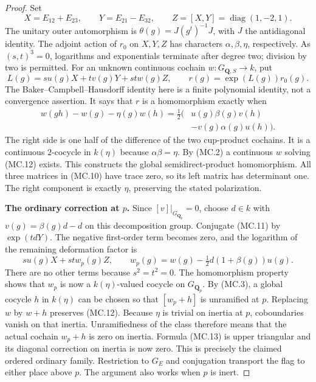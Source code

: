 \documentclass[11pt,a4paper]{article}
\theoremstyle{definition}
\renewcommand{\paragraph}[1]{\par\smallskip\noindent\textbf{#1}\quad\ignorespaces}
\begin{document}
\begin{proof}
Set
\[
 X=E_{12}+E_{23},\qquad Y=E_{21}-E_{32},\qquad
 Z=[X,Y]=\operatorname{diag}(1,-2,1).                     \tag{MC.10}
\]
The unitary outer automorphism is
$\theta(g)=J(g^t)^{-1}J$, with $J$ the antidiagonal identity.
The adjoint action of $r_0$ on $X,Y,Z$ has characters
$\alpha,\beta,\eta$, respectively.
As $(s,t)^3=0$, logarithms and exponentials terminate after
degree two; division by two is permitted.
For an unknown continuous cochain $w:G_{\mathbf Q,S}\to k$,
put
\[
 L(g)=s u(g)X+t v(g)Y+st w(g)Z,
 \qquad r(g)=\exp(L(g))r_0(g).                            \tag{MC.11}
\]
The Baker--Campbell--Hausdorff identity here is a finite
polynomial identity, not a convergence assertion.
It says that $r$ is a homomorphism exactly when
\[
 \begin{split}
 w(gh)-w(g)-\eta(g)w(h)
   =\tfrac12\bigl(&u(g)\beta(g)v(h)\\
                 &-v(g)\alpha(g)u(h)\bigr).
 \end{split}                                             \tag{MC.12}
\]
The right side is one half of the difference of the two
cup-product cochains.  It is a continuous $2$-cocycle in
$k(\eta)$ because $\alpha\beta=\eta$.
By (MC.2) a continuous $w$ solving (MC.12) exists.
This constructs the global semidirect-product homomorphism.
All three matrices in (MC.10) have trace zero, so its left
matrix has determinant one.  The right component is exactly
$\eta$, preserving the stated polarization.

\paragraph{The ordinary correction at $p$.}
Since $[v]|_{G_{\mathbf Q_p}}=0$, choose $d\in k$ with
$v(g)=\beta(g)d-d$ on this decomposition group.
Conjugate (MC.11) by $\exp(tdY)$.
The negative first-order term becomes zero, and the logarithm
of the remaining deformation factor is
\[
       s u(g)X+st w_p(g)Z,\qquad
       w_p(g)=w(g)-\tfrac12d(1+\beta(g))u(g).             \tag{MC.13}
\]
There are no other terms because $s^2=t^2=0$.
The homomorphism property shows that $w_p$ is now a
$k(\eta)$-valued cocycle on $G_{\mathbf Q_p}$.
By (MC.3), a global cocycle $h$ in $k(\eta)$ can be chosen
so that $[w_p+h]$ is unramified at $p$.
Replacing $w$ by $w+h$ preserves (MC.12).
Because $\eta$ is trivial on inertia at $p$, coboundaries
vanish on that inertia.  Unramifiedness of the class therefore
means that the actual cochain $w_p+h$ is zero on inertia.
Formula (MC.13) is upper triangular and its diagonal
correction on inertia is now zero.  This is precisely the
claimed ordered ordinary family.  Restriction to $G_E$
and conjugation transport the flag to either place above $p$.
The argument also works when $p$ is inert.


\end{proof}
\end{document}
